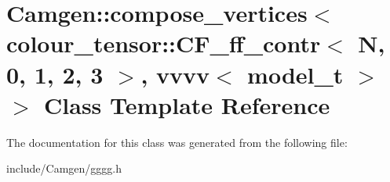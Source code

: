 \hypertarget{a00100}{\section{Camgen\-:\-:compose\-\_\-vertices$<$ colour\-\_\-tensor\-:\-:C\-F\-\_\-ff\-\_\-contr$<$ N, 0, 1, 2, 3 $>$, vvvv$<$ model\-\_\-t $>$ $>$ Class Template Reference}
\label{a00100}
}


The documentation for this class was generated from the following file\-:\begin{DoxyCompactItemize}
\item 
include/\-Camgen/gggg.\-h\end{DoxyCompactItemize}
